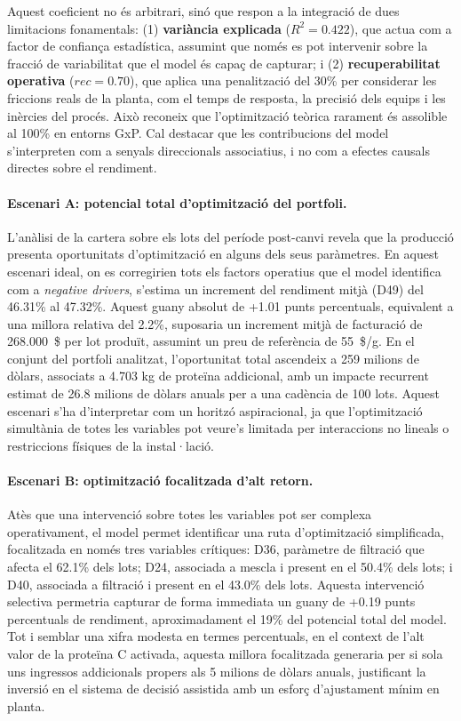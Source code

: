 Aquest coeficient no és arbitrari, sinó que respon a la integració de dues limitacions fonamentals: (1) \textbf{variància explicada} ($R^2 = 0.422$), que actua com a factor de confiança estadística, assumint que només es pot intervenir sobre la fracció de variabilitat que el model és capaç de capturar; i (2) \textbf{recuperabilitat operativa} ($rec = 0.70$), que aplica una penalització del 30\% per considerar les friccions reals de la planta, com el temps de resposta, la precisió dels equips i les inèrcies del procés. Això reconeix que l'optimització teòrica rarament és assolible al 100\% en entorns GxP. Cal destacar que les contribucions del model s'interpreten com a senyals direccionals associatius, i no com a efectes causals directes sobre el rendiment.

\paragraph{Escenari A: potencial total d'optimització del portfoli.} L'anàlisi de la cartera sobre els lots del període post-canvi revela que la producció presenta oportunitats d'optimització en alguns dels seus paràmetres. En aquest escenari ideal, on es corregirien tots els factors operatius que el model identifica com a \emph{negative drivers}, s'estima un increment del rendiment mitjà (D49) del 46.31\% al 47.32\%. Aquest guany absolut de +1.01 punts percentuals, equivalent a una millora relativa del 2.2\%, suposaria un increment mitjà de facturació de 268.000~\$ per lot produït, assumint un preu de referència de 55~\$/g. En el conjunt del portfoli analitzat, l'oportunitat total ascendeix a 259 milions de dòlars, associats a 4.703 kg de proteïna addicional, amb un impacte recurrent estimat de 26.8 milions de dòlars anuals per a una cadència de 100 lots. Aquest escenari s'ha d'interpretar com un horitzó aspiracional, ja que l'optimització simultània de totes les variables pot veure's limitada per interaccions no lineals o restriccions físiques de la instal·lació.

\paragraph{Escenari B: optimització focalitzada d'alt retorn.} Atès que una intervenció sobre totes les variables pot ser complexa operativament, el model permet identificar una ruta d'optimització simplificada, focalitzada en només tres variables crítiques: D36, paràmetre de filtració que afecta el 62.1\% dels lots; D24, associada a mescla i present en el 50.4\% dels lots; i D40, associada a filtració i present en el 43.0\% dels lots. Aquesta intervenció selectiva permetria capturar de forma immediata un guany de +0.19 punts percentuals de rendiment, aproximadament el 19\% del potencial total del model. Tot i semblar una xifra modesta en termes percentuals, en el context de l'alt valor de la proteïna C activada, aquesta millora focalitzada generaria per si sola uns ingressos addicionals propers als 5 milions de dòlars anuals, justificant la inversió en el sistema de decisió assistida amb un esforç d'ajustament mínim en planta.

